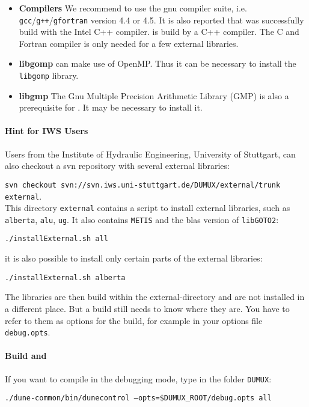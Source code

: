 \begin{itemize}
\item \textbf{Compilers} We recommend to use the gnu compiler suite, i.e. \texttt{gcc}/\texttt{g++}/\texttt{gfortran} version 4.4 or 4.5. It is also reported that \Dune was successfully build with the Intel C++ compiler. \Dune is build by a C++ compiler. The C and Fortran compiler is only needed for a few external libraries.

\item \textbf{libgomp} \Dune can make use of OpenMP. Thus it can be necessary to install the \texttt{libgomp} library.

\item \textbf{libgmp} The Gnu Multiple Precision Arithmetic Library (GMP) is also a prerequisite for \Dune. It may be necessary to install it.
\end{itemize}

\paragraph{Hint for IWS Users} Users from the Institute of Hydraulic Engineering, University of Stuttgart,
can also checkout a svn repository with several external libraries: 

\texttt{svn checkout svn://svn.iws.uni-stuttgart.de/DUMUX/external/trunk external}. \\

This directory \texttt{external} contains a script to install external libraries, such as 
\texttt{alberta}, \texttt{alu}, \texttt{ug}. It also contains \texttt{METIS} and the blas version of \texttt{libGOTO2}: 
\begin{center}
\texttt{./installExternal.sh all}
\end{center}
it is also possible to install only certain parts of the external libraries:\\ 
\begin{center}
\texttt{./installExternal.sh alberta}
\end{center}

The libraries are then build within the external-directory and are not installed in a different place. But a \Dune build still needs to know where they are. You have to refer to them as options for the \Dune build, for example in your options file \texttt{debug.opts}.


\paragraph{Build \Dune and \Dumux}
\label{buildIt}
If you want to compile in the debugging mode, type in the folder \texttt{DUMUX}: 
\begin{center}
\texttt{./dune-common/bin/dunecontrol --opts=\$DUMUX\_ROOT/debug.opts all}
\end{center}

